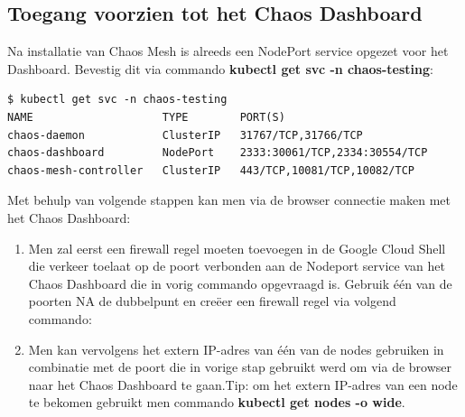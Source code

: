 \subsection{Toegang voorzien tot het Chaos Dashboard}

Na installatie van Chaos Mesh is alreeds een NodePort service opgezet voor het Dashboard. Bevestig dit via commando {\bf kubectl get svc -n chaos-testing}: 
\begin{lstlisting}
$ kubectl get svc -n chaos-testing
NAME                    TYPE        PORT(S)                                
chaos-daemon            ClusterIP   31767/TCP,31766/TCP                     
chaos-dashboard         NodePort    2333:30061/TCP,2334:30554/TCP          
chaos-mesh-controller   ClusterIP   443/TCP,10081/TCP,10082/TCP
\end{lstlisting}

Met behulp van volgende stappen kan men via de browser connectie maken met het Chaos Dashboard:
\begin{enumerate}
    \item Men zal eerst een firewall regel moeten toevoegen in de Google Cloud Shell die verkeer toelaat op de poort verbonden aan de Nodeport service van het Chaos Dashboard die in vorig commando opgevraagd is. Gebruik één van de poorten NA de dubbelpunt en creëer een firewall regel via volgend commando:
    \item Men kan vervolgens het extern IP-adres van één van de nodes gebruiken in combinatie met de poort die in vorige stap gebruikt werd om via de browser naar het Chaos Dashboard te gaan.\newline Tip: om het extern IP-adres van een node te bekomen gebruikt men commando {\bf kubectl get nodes -o wide}.
\end{enumerate}

